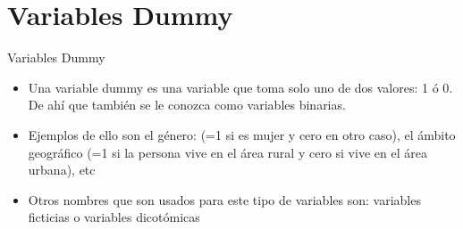 \section{Variables Dummy}  

\begin{frame}{Variables Dummy}
	\begin{itemize}
		\item Una variable dummy es una variable que toma solo uno de dos valores: 1 ó 0. De ahí­ que también se le conozca como variables
		binarias.
		\item Ejemplos de ello son el género: (=1 si es mujer y cero en otro caso), el ámbito geográfico (=1 si la persona vive en el área rural y
		cero si vive en el área urbana), etc
		\item Otros nombres que son usados para este tipo de variables son: variables ficticias o variables dicotómicas
	\end{itemize}
\end{frame}

